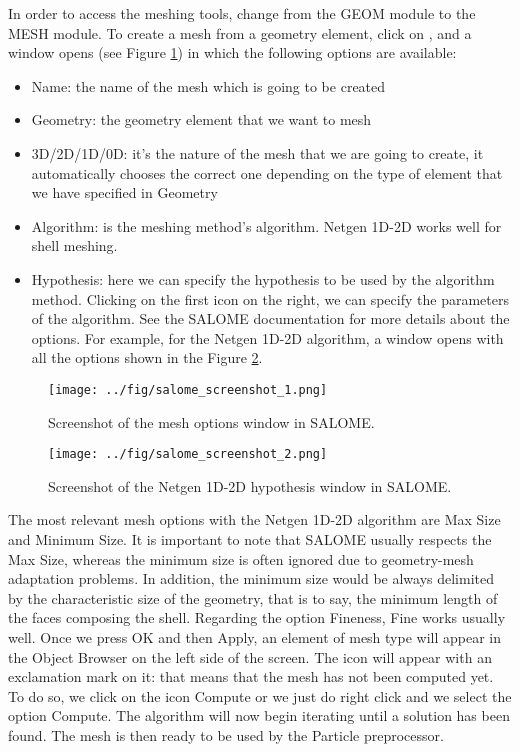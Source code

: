 \documentclass{../GPUSPHtemplate}
\begin{document}
In order to access the meshing tools, change from the GEOM 
module to the MESH module.
To create a mesh from a geometry element, click on , 
and a window opens (see Figure \ref{fig:salome_screenshot_1}) in which the following options are available:
\begin{itemize}
\item Name: the name of the mesh which is going to be created
\item Geometry: the geometry element that we want to mesh
\item 3D/2D/1D/0D: it’s the nature of the mesh that we are 
going to create, it automatically chooses the correct one 
depending on the type of element that we have specified in Geometry
\item Algorithm: is the meshing method’s algorithm. 
Netgen 1D-2D works well for shell meshing.
\item Hypothesis: here we can specify the hypothesis to be used 
by the algorithm method. Clicking on the first icon on the right, 
we can specify the parameters of the algorithm. See the SALOME 
documentation for more details about the options. 
For example, for the Netgen 1D-2D algorithm, a window opens 
with all the options shown in the Figure \ref{fig:salome_screenshot_2}.
\end{itemize}

\begin{figure}[h]
  \begin{center}
    \texttt{[image: ../fig/salome\_screenshot\_1.png]}
    \caption{Screenshot of the mesh options window in SALOME.}\label{fig:salome_screenshot_1}   
  \end{center}
\end{figure}

\begin{figure}[h]
  \begin{center}
    \texttt{[image: ../fig/salome\_screenshot\_2.png]}
    \caption{Screenshot of the Netgen 1D-2D hypothesis window in SALOME.}\label{fig:salome_screenshot_2}   
  \end{center}
\end{figure}

The most relevant mesh options with the Netgen 1D-2D algorithm 
are Max Size and Minimum Size. 
It is important to note that SALOME usually respects the Max Size, 
whereas the minimum size is often ignored due to geometry-mesh 
adaptation problems. In addition, the minimum size would be 
always delimited by the characteristic size of the geometry, 
that is to say, the minimum length of the faces composing the shell. 
Regarding the option Fineness, Fine works usually well. 
Once we press OK and then Apply, an element of mesh type 
will appear in the Object Browser on the left side of the screen. 
The icon will appear with an exclamation mark on it: that means 
that the mesh has not been computed yet. To do so, we click on 
the icon Compute or we just do right click and we select 
the option Compute. The algorithm will now begin iterating 
until a solution has been found. 
The mesh is then ready to be used by the Particle preprocessor. \\
\end{document}
